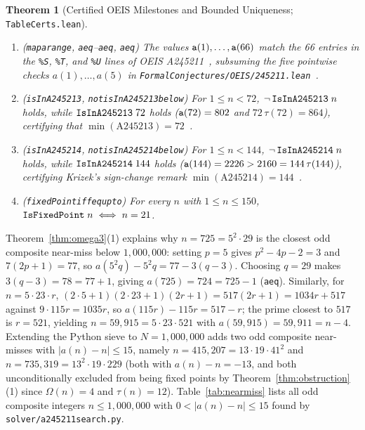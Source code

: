 \documentclass[11pt,reqno]{amsart}
\theoremstyle{plain}
\newtheorem{theorem}{Theorem}[section]
\theoremstyle{definition}
\theoremstyle{remark}
\newcommand{\leanid}[1]{\texttt{\upshape\def\_{\char95\relax}#1}}
\begin{document}
\begin{theorem}[Certified OEIS Milestones and Bounded Uniqueness; \leanid{TableCerts.lean}]
\label{thm:tables}
\leavevmode
\begin{enumerate}
  \item (\leanid{map\_\allowbreak a\_\allowbreak range\_}, \leanid{a\_\_\allowbreak eq}--\leanid{a\_\_\allowbreak eq}, \leanid{a\_\_\allowbreak eq}) The values $\leanid{a}(1), \dots, \leanid{a}(66)$ match the 66 entries in the \texttt{\%S}, \texttt{\%T}, and \texttt{\%U} lines of OEIS A245211~\cite{OEIS-A245211}, subsuming the five pointwise checks $a(1),\dots,a(5)$ in \texttt{FormalConjectures/OEIS/245211.lean}~\cite{FormalConjectures2026}.
  \item (\leanid{isInA245213\_}, \leanid{not\_\allowbreak isInA245213\_\allowbreak below\_\allowbreak 72}) For $1 \le n < 72$, $\neg\,\leanid{IsInA245213}\;n$ holds, while $\leanid{IsInA245213}\;72$ holds ($\leanid{a}(72) = 802$ and $72\,\tau(72) = 864$), certifying that $\min(\text{A245213}) = 72$~\cite{OEIS-A245213}.
  \item (\leanid{isInA245214\_}, \leanid{not\_\allowbreak isInA245214\_\allowbreak below\_\allowbreak 144}) For $1 \le n < 144$, $\neg\,\leanid{IsInA245214}\;n$ holds, while $\leanid{IsInA245214}\;144$ holds ($\leanid{a}(144) = 2226 > 2160 = 144\,\tau(144)$), certifying Krizek's sign-change remark $\min(\text{A245214}) = 144$~\cite{OEIS-A245211,OEIS-A245214}.
  \item (\leanid{fixedPoint\_\allowbreak iff\_\allowbreak eq\_\allowbreak 21\_\allowbreak upto\_\allowbreak 150}) For every $n$ with $1 \le n \le 150$, $\leanid{IsFixedPoint}\;n \iff n = 21$.
\end{enumerate}
\end{theorem}

Theorem~\ref{thm:omega3}(1) explains why $n = 725 = 5^2 \cdot 29$ is the closest odd composite near-miss below $1{,}000{,}000$: setting $p = 5$ gives $p^2 - 4p - 2 = 3$ and $7(2p + 1) = 77$, so $a(5^2 q) - 5^2 q = 77 - 3(q - 3)$. Choosing $q = 29$ makes $3(q - 3) = 78 = 77 + 1$, giving $a(725) = 724 = 725 - 1$ (\leanid{a\_\_\allowbreak eq}). Similarly, for $n = 5 \cdot 23 \cdot r$, $(2\cdot 5 + 1)(2\cdot 23 + 1)(2r + 1) = 517(2r + 1) = 1034r + 517$ against $9 \cdot 115 r = 1035r$, so $a(115r) - 115r = 517 - r$; the prime closest to $517$ is $r = 521$, yielding $n = 59{,}915 = 5 \cdot 23 \cdot 521$ with $a(59{,}915) = 59{,}911 = n - 4$. Extending the Python sieve to $N = 1{,}000{,}000$ adds two odd composite near-misses with $|a(n) - n| \le 15$, namely $n = 415{,}207 = 13 \cdot 19 \cdot 41^2$ and $n = 735{,}319 = 13^2 \cdot 19 \cdot 229$ (both with $a(n) - n = -13$, and both unconditionally excluded from being fixed points by Theorem~\ref{thm:obstruction}(1) since $\Omega(n) = 4$ and $\tau(n) = 12$). Table~\ref{tab:nearmiss} lists all odd composite integers $n \le 1{,}000{,}000$ with $0 < |a(n) - n| \le 15$ found by \leanid{solver/a245211\_\allowbreak search.py}.
\end{document}

